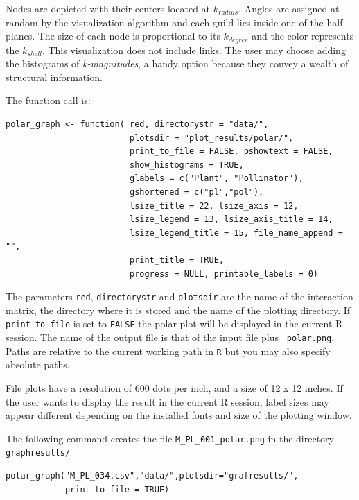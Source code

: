 \documentclass[12pt]{article}
\begin{document}
Nodes are depicted with their centers located at $k_{radius}$. Angles are assigned at random by the visualization algorithm and each guild lies inside one of the half planes. The size of each node is proportional to its $k_{degree}$ and the color represents the $k_{shell}$. This visualization does not include links. The user may choose adding the histograms of \textit{k-magnitudes}, a handy option because they convey a wealth of structural information.


\noindent The function call is:

\fontsize{3.5mm}{3.5mm}\selectfont
\begin{verbatim}
polar_graph <- function( red, directorystr = "data/", 
                         plotsdir = "plot_results/polar/", 
                         print_to_file = FALSE, pshowtext = FALSE,
                         show_histograms = TRUE, 
                         glabels = c("Plant", "Pollinator"),
                         gshortened = c("pl","pol"),
                         lsize_title = 22, lsize_axis = 12, 
                         lsize_legend = 13, lsize_axis_title = 14, 
                         lsize_legend_title = 15, file_name_append = "",
                         print_title = TRUE,
                         progress = NULL, printable_labels = 0)
\end{verbatim}
\normalsize

The parameters \texttt{red}, \texttt{directorystr} and \texttt{plotsdir} are the name of the interaction matrix, the directory where it is stored and the name of the plotting directory. If \texttt{print\_to\_file} is set to \texttt{FALSE} the polar plot will be displayed in the current R session. The name of the output file is that of the input file
plus \texttt{\_polar.png}. Paths are relative to the current working path in \texttt{R} but you may also specify absolute paths.

File plots have a resolution of 600 dots per inch, and a size of 12 x 12 inches. If the user wants to display the result in the current R session, label sizes may appear different depending on the installed fonts and size of the plotting window.

The following command creates the file \texttt{M\_PL\_001\_polar.png} in the directory \texttt{graphresults/}

\fontsize{3.5mm}{3.5mm}\selectfont
\begin{verbatim}
polar_graph("M_PL_034.csv","data/",plotsdir="grafresults/",
            print_to_file = TRUE)
\end{verbatim}
\normalsize
\end{document}
